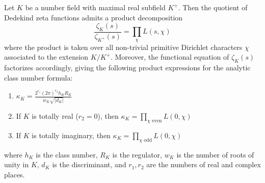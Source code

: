 Let $K$ be a number field with maximal real subfield $K^+$. Then the quotient of Dedekind zeta functions admits a product decomposition
$$\frac{\zeta_K(s)}{\zeta_{K^+}(s)} = \prod_{\chi} L(s, \chi)$$
where the product is taken over all non-trivial primitive Dirichlet characters $\chi$ associated to the extension $K/K^+$. Moreover, the functional equation of $\zeta_K(s)$ factorizes accordingly, giving the following product expressions for the analytic class number formula:

\begin{enumerate}
\item[(i)] $\displaystyle \kappa_K = \frac{2^{r_1}(2\pi)^{r_2} h_K R_K}{w_K \sqrt{|d_K|}}$
\item[(ii)] If $K$ is totally real ($r_2 = 0$), then $\kappa_K = \prod_{\chi \text{ even}} L(0, \chi)$
\item[(iii)] If $K$ is totally imaginary, then $\kappa_K = \prod_{\chi \text{ odd}} L(0, \chi)$
\end{enumerate}
where $h_K$ is the class number, $R_K$ is the regulator, $w_K$ is the number of roots of unity in $K$, $d_K$ is the discriminant, and $r_1, r_2$ are the numbers of real and complex places.
